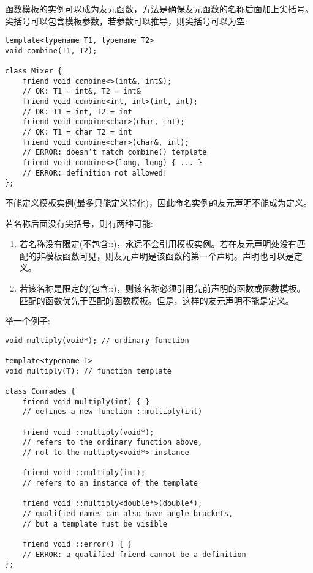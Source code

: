 函数模板的实例可以成为友元函数，方法是确保友元函数的名称后面加上尖括号。尖括号可以包含模板参数，若参数可以推导，则尖括号可以为空:

\begin{lstlisting}[style=styleCXX]
template<typename T1, typename T2>
void combine(T1, T2);

class Mixer {
	friend void combine<>(int&, int&);
	// OK: T1 = int&, T2 = int&
	friend void combine<int, int>(int, int);
	// OK: T1 = int, T2 = int
	friend void combine<char>(char, int);
	// OK: T1 = char T2 = int
	friend void combine<char>(char&, int);
	// ERROR: doesn’t match combine() template
	friend void combine<>(long, long) { ... }
	// ERROR: definition not allowed!
};
\end{lstlisting}

不能定义模板实例(最多只能定义特化)，因此命名实例的友元声明不能成为定义。

若名称后面没有尖括号，则有两种可能:

\begin{enumerate}
\item 
若名称没有限定(不包含::)，永远不会引用模板实例。若在友元声明处没有匹配的非模板函数可见，则友元声明是该函数的第一个声明。声明也可以是定义。

\item 
若该名称是限定的(包含::)，则该名称必须引用先前声明的函数或函数模板。匹配的函数优先于匹配的函数模板。但是，这样的友元声明不能是定义。
\end{enumerate}

举一个例子:

\begin{lstlisting}[style=styleCXX]
void multiply(void*); // ordinary function

template<typename T>
void multiply(T); // function template

class Comrades {
	friend void multiply(int) { }
	// defines a new function ::multiply(int)
	
	friend void ::multiply(void*);
	// refers to the ordinary function above,
	// not to the multiply<void*> instance
	
	friend void ::multiply(int);
	// refers to an instance of the template
	
	friend void ::multiply<double*>(double*);
	// qualified names can also have angle brackets,
	// but a template must be visible
	
	friend void ::error() { }
	// ERROR: a qualified friend cannot be a definition
};
\end{lstlisting}

